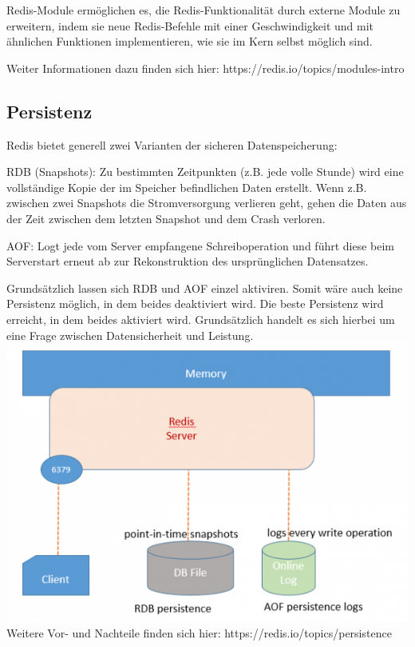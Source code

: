 Redis-Module ermöglichen es, die Redis-Funktionalität durch externe Module zu erweitern, indem sie neue Redis-Befehle mit einer Geschwindigkeit und mit ähnlichen Funktionen implementieren, wie sie im Kern selbst möglich sind.

Weiter Informationen dazu finden sich hier: https://redis.io/topics/modules-intro
\clearpage
\subsection{Persistenz}
Redis bietet generell zwei Varianten der sicheren Datenspeicherung:

RDB (Snapshots): Zu bestimmten Zeitpunkten (z.B. jede volle Stunde) wird eine vollständige Kopie der im Speicher befindlichen Daten erstellt. Wenn z.B. zwischen zwei Snapshots die Stromversorgung verlieren geht, gehen die Daten aus der Zeit zwischen dem letzten Snapshot und dem Crash verloren. 

AOF: Logt jede vom Server empfangene Schreiboperation und führt diese beim Serverstart erneut ab zur Rekonstruktion des ursprünglichen Datensatzes.

Grundsätzlich lassen sich RDB und AOF einzel aktiviren. Somit wäre auch keine Persistenz möglich, in dem beides deaktiviert wird. Die beste Persistenz wird erreicht, in dem beides aktiviert wird. Grundsätzlich handelt es sich hierbei um eine Frage zwischen Datensicherheit und Leistung.\\

\includegraphics[width=160mm]{media/redis.png}\\[10mm]	
Weitere Vor- und Nachteile finden sich hier: https://redis.io/topics/persistence
\clearpage
